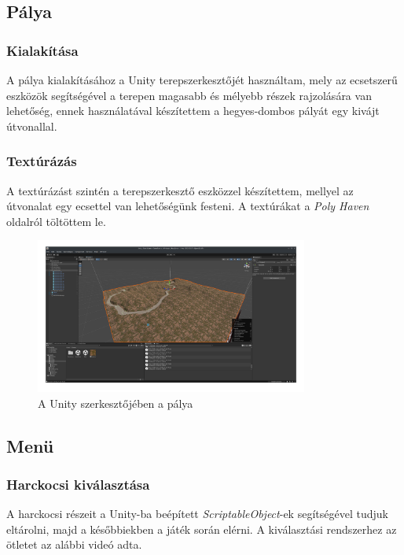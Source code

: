 \documentclass[
]{thesis-ekf}
\theoremstyle{definition}
\theoremstyle{remark}
\begin{document}
\subsection{Pálya}

\subsubsection{Kialakítása}

A pálya kialakításához a Unity terepszerkesztőjét használtam, mely az ecsetszerű eszközök segítségével a terepen magasabb és mélyebb részek rajzolására van lehetőség, ennek használatával készítettem a hegyes-dombos pályát egy kivájt útvonallal.
\subsubsection{Textúrázás}

A textúrázást szintén a terepszerkesztő eszközzel készítettem, mellyel az útvonalat egy ecsettel van lehetőségünk festeni. A textúrákat a \emph{Poly Haven}\cite{polyhaven} oldalról töltöttem le.

\begin{figure}[H]
    \centering
    \includegraphics[width=0.8\textwidth]{screenshots/mapineditor.png}
    \caption{A Unity szerkesztőjében a pálya}
    \label{fig:mapineditor}
\end{figure}

\subsection{Menü}

\subsubsection{Harckocsi kiválasztása}

A harckocsi részeit a Unity-ba beépített \emph{ScriptableObject}-ek segítségével tudjuk eltárolni, majd a későbbiekben a játék során elérni. A kiválasztási rendszerhez az ötletet az alábbi videó\cite{selectionmenu} adta.
\end{document}
